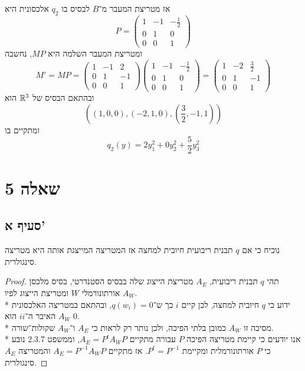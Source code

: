 אז מטריצת המעבר מ־$B$ לבסיס בו $q_2$ אלכסונית היא
\[
	P = \begin{pmatrix}
		1 & -1 & -\frac{1}{2} \\
		0 & 1 & 0 \\
		0 & 0 & 1
	\end{pmatrix}
\]
ומטריצת המעבר השלמה היא $MP$, נחשבה
\[
	M' = MP = 
	\begin{pmatrix} 1 & -1 & 2 \\
		0 & 1 & -1 \\
		0 & 0 & 1
	\end{pmatrix}
	\begin{pmatrix}
		1 & -1 & -\frac{1}{2} \\
		0 & 1 & 0 \\
		0 & 0 & 1
	\end{pmatrix}
	= \begin{pmatrix}
		1 & -2 & \frac{3}{2} \\
		0 & 1 & -1 \\
		0 & 0 & 1
	\end{pmatrix}
\]
ובהתאם הבסיס של $\mathbb{R}^3$ הוא
\[
	((1, 0, 0), (-2, 1, 0), (\frac{3}{2}, -1, 1))
\]
ומתקיים בו
\[
	q_2(y) = 2y_1^2 + 0y_2^2 + \frac{5}{2}y_3^2
\]

\section{שאלה 5}
\subsection{סעיף א'}
נוכיח כי אם $q$ תבנית ריבועית חיובית למחצה אז המטריצה המייצגת אותה היא מטריצה סינגולרית.
\begin{proof}
	תהי $q$ תבנית ריבועית, $A_E$ מטריצת הייצוג שלה בבסיס הסטנדרטי, בסיס מלכסן אורתונורמלי $W$ ומטריצת הייצוג לפיו $A_W$. \\*
	ידוע כי $q$ חיובית למחצה, לכן קיים $i$ כך ש־$q(w_i) = 0$, ובהתאם במטריצה האלכסונית $A_W$ האיבר ה־$ii$ הוא $0$. \\*
	מסיבה זו $A_W$ כמובן בלתי הפיכה, ולכן נותר רק לראות כי $A_E$ ו־$A_W$ שקולות־שורה. \\*
	אנו יודעים כי קיימת מטריצה הפיכה $P$ עבורה מתקיים $A_E = P^t A_W P$, וממשפט 2.3.7 נובע כי $P$ אורתונורמלית ומקיימת $P^t = P^{-1}$.
	אז מתקיים $A_E = P^{-1} A_W P$ והמטריצה $A_E$ סינגולרית.
\end{proof}

